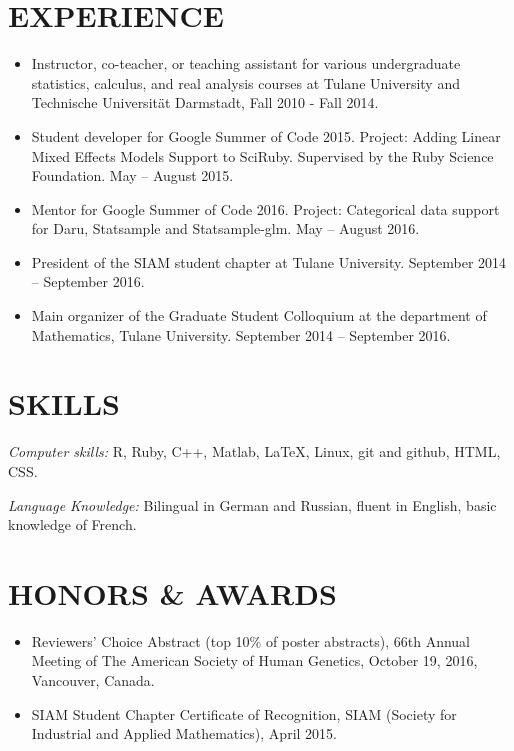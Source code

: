\documentclass[margin]{res} %
\begin{document}
\begin{resume}

\section{EXPERIENCE}

\begin{itemize}
    \item Instructor, co-teacher, or teaching assistant for various undergraduate statistics, calculus, and real analysis courses at Tulane University and Technische Universit\"{a}t Darmstadt, Fall 2010 - Fall 2014.
    \item Student developer for Google Summer of Code 2015. Project: Adding Linear Mixed Effects Models Support to SciRuby. Supervised by the Ruby Science Foundation. May -- August 2015.
    \item Mentor for Google Summer of Code 2016. Project: Categorical data support for Daru, Statsample and Statsample-glm. May -- August 2016.
    \item President of the SIAM student chapter at Tulane University. September 2014 -- September 2016.
    \item Main organizer of the Graduate Student Colloquium at the department of Mathematics, Tulane University. September 2014 -- September 2016.
\end{itemize}
 

\section{SKILLS}

{\sl Computer skills:}
R, Ruby, C++, Matlab, \LaTeX, Linux, git and github, HTML, CSS.

{\sl Language Knowledge:}
Bilingual in German and Russian, fluent in English, basic knowledge of French.

\section{HONORS \& AWARDS}

\begin{itemize}
  \item Reviewers’ Choice Abstract (top 10\% of poster abstracts), 66th Annual Meeting of The American Society of Human Genetics, October 19, 2016, Vancouver, Canada.
  \item SIAM Student Chapter Certificate of Recognition, SIAM (Society for Industrial and Applied Mathematics), April 2015.
\end{itemize}


\end{resume}
\end{document}
